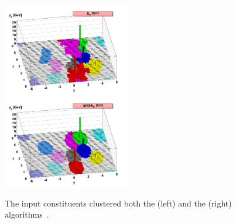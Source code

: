 \begin{figure}[h]
\includegraphics[width=0.5\textwidth]{fig/thry/kt.png}
\includegraphics[width=0.5\textwidth]{fig/thry/antikt.png}
\caption{The input constituents clustered both the \kt (left) and the \akt (right) algorithms~\cite{antikt1}.}
\label{fig:ktalg}
\end{figure}

